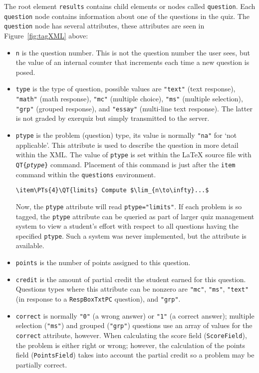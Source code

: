 \documentclass{article}
\makeatletter
\let\bslash=\@backslashchar
\def\cs#1{\texttt{\bslash#1}}
\def\meta#1{\textit{\texttt{#1}}}
\let\pkg\textsf
\let\env\texttt
\let\amtIndent\leftmargini
\def\darg#1{\{#1\}}
\makeatother
\begin{document}
The root element \texttt{results} contains child elements or
nodes called \texttt{question}. Each \texttt{question} node contains
information about one of the questions in the quiz. The \texttt{question}
node has several attributes, these attributes are seen in
Figure~\ref{fig:tagXML} above:
\begin{itemize}
    \item \texttt{n} is the question number. This is not the question
        number the user sees, but the value of an internal counter that
        increments each time a new question is posed.
    \item \texttt{type} is the type of question, possible values are
        \texttt{"text"} (text response), \texttt{"math"} (math response),
        \texttt{"mc"} (multiple choice), \texttt{"ms"} (multiple
        selection), \texttt{"grp"} (grouped response), and \texttt{"essay"}
        (multi-line text response). The latter is not graded by
        \pkg{exerquiz} but simply transmitted to the server.
    \item \texttt{ptype} is the problem (question) type, its value is
        normally \texttt{"na"} for `not applicable'. This attribute is used
        to describe the question in more detail within the XML. The value
        of \texttt{ptype} is set within the {\LaTeX} source file with
        \cs{QT\texttt{\darg{\meta{ptype}}}} command.
        Placement of this command is just after the \cs{item} command
        within the \env{questions} environment.
\begin{Verbatim}[xleftmargin=\amtIndent,fontsize=\small]
\item\PTs{4}\QT{limits} Compute $\lim_{n\to\infty}...$
\end{Verbatim}
Now, the \texttt{ptype} attribute will read \texttt{ptype="limits"}. If
each problem is so tagged, the \texttt{ptype} attribute can be queried as
part of larger quiz management system to view a student's effort with
respect to all questions having the specified \texttt{ptype}. Such a system
was never implemented, but the attribute is available.
\item \texttt{points} is the number of points assigned to this question.
\item \texttt{credit} is the amount of partial credit the student earned
    for this question. Questions types where this attribute can be nonzero
    are \texttt{"mc"}, \texttt{"ms"}, \texttt{"text"} (in response to a
    \cs{RespBoxTxtPC} question), and \texttt{"grp"}.
\item \texttt{correct} is normally \texttt{"0"} (a wrong answer) or
    \texttt{"1"} (a correct answer); multiple selection (\texttt{"ms"}) and
    grouped (\texttt{"grp"}) questions use an array of values for the
    \texttt{correct} attribute, however. When calculating the score field
    (\cs{ScoreField}), the problem is either right or wrong; however, the calculation
    of the points field (\cs{PointsField}) takes into account the partial
    credit so a problem may be partially correct.
\end{itemize}
\end{document}
